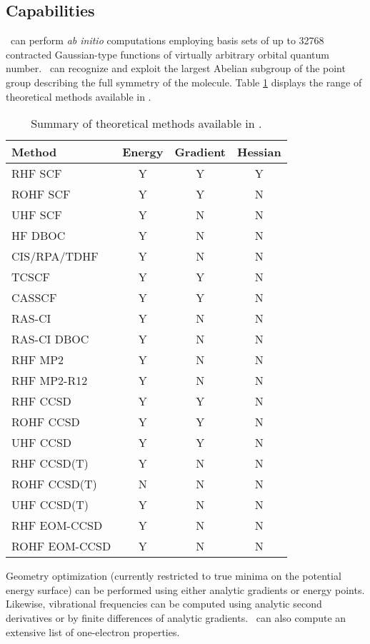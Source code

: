\subsection{Capabilities}
\PSIthree\ can perform {\em ab initio} computations employing
basis sets of up to 32768 contracted Gaussian-type functions of
virtually arbitrary orbital quantum number.
\PSIthree\ can recognize and exploit the largest Abelian subgroup of the
point group describing the full symmetry of the molecule.
Table \ref{table:methods} displays the range of theoretical
methods available in \PSIthree .
\begin{table}
\caption{Summary of theoretical methods available in \PSIthree.} \label{table:methods}
\parsep 10pt
\begin{center}
\begin{tabular}{lccc} \hline\hline
Method        & Energy & Gradient & Hessian \\ \hline
RHF SCF       & Y & Y & Y \\
ROHF SCF      & Y & Y & N \\
UHF SCF       & Y & N & N \\
HF DBOC       & Y & N & N \\
CIS/RPA/TDHF  & Y & N & N \\
TCSCF         & Y & Y & N \\
CASSCF        & Y & Y & N \\
RAS-CI        & Y & N & N \\
RAS-CI DBOC   & Y & N & N \\
RHF MP2       & Y & N & N \\
RHF MP2-R12   & Y & N & N \\
RHF CCSD      & Y & Y & N \\
ROHF CCSD     & Y & Y & N \\ 
UHF CCSD      & Y & Y & N \\
RHF CCSD(T)   & Y & N & N \\
ROHF CCSD(T)  & N & N & N \\
UHF CCSD(T)   & Y & N & N \\
RHF EOM-CCSD  & Y & N & N \\
ROHF EOM-CCSD & Y & N & N \\
\hline\hline
\end{tabular}
\end{center}
\end{table}
Geometry optimization (currently restricted to true minima on the potential
energy surface) can be performed using either analytic gradients
or energy points.  Likewise, vibrational frequencies can be 
computed using analytic second derivatives or by finite
differences of analytic gradients.
\PSIthree\ can also compute an extensive list of one-electron properties.

